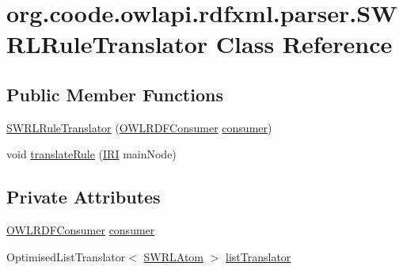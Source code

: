 \hypertarget{classorg_1_1coode_1_1owlapi_1_1rdfxml_1_1parser_1_1_s_w_r_l_rule_translator}{\section{org.\-coode.\-owlapi.\-rdfxml.\-parser.\-S\-W\-R\-L\-Rule\-Translator Class Reference}
\label{classorg_1_1coode_1_1owlapi_1_1rdfxml_1_1parser_1_1_s_w_r_l_rule_translator}
}
\subsection*{Public Member Functions}
\begin{DoxyCompactItemize}
\item 
\hyperlink{classorg_1_1coode_1_1owlapi_1_1rdfxml_1_1parser_1_1_s_w_r_l_rule_translator_abf944238ce47c09f4ff412af4dff6d84}{S\-W\-R\-L\-Rule\-Translator} (\hyperlink{classorg_1_1coode_1_1owlapi_1_1rdfxml_1_1parser_1_1_o_w_l_r_d_f_consumer}{O\-W\-L\-R\-D\-F\-Consumer} \hyperlink{classorg_1_1coode_1_1owlapi_1_1rdfxml_1_1parser_1_1_s_w_r_l_rule_translator_af28698752d12be9e486bd072505ac4f3}{consumer})
\item 
void \hyperlink{classorg_1_1coode_1_1owlapi_1_1rdfxml_1_1parser_1_1_s_w_r_l_rule_translator_acf1edda8ed620c65d38c1285c9a64343}{translate\-Rule} (\hyperlink{classorg_1_1semanticweb_1_1owlapi_1_1model_1_1_i_r_i}{I\-R\-I} main\-Node)
\end{DoxyCompactItemize}
\subsection*{Private Attributes}
\begin{DoxyCompactItemize}
\item 
\hyperlink{classorg_1_1coode_1_1owlapi_1_1rdfxml_1_1parser_1_1_o_w_l_r_d_f_consumer}{O\-W\-L\-R\-D\-F\-Consumer} \hyperlink{classorg_1_1coode_1_1owlapi_1_1rdfxml_1_1parser_1_1_s_w_r_l_rule_translator_af28698752d12be9e486bd072505ac4f3}{consumer}
\item 
Optimised\-List\-Translator$<$ \hyperlink{interfaceorg_1_1semanticweb_1_1owlapi_1_1model_1_1_s_w_r_l_atom}{S\-W\-R\-L\-Atom} $>$ \hyperlink{classorg_1_1coode_1_1owlapi_1_1rdfxml_1_1parser_1_1_s_w_r_l_rule_translator_a350f0d64a7670bd5c5be2a12800eb378}{list\-Translator}
\end{DoxyCompactItemize}


